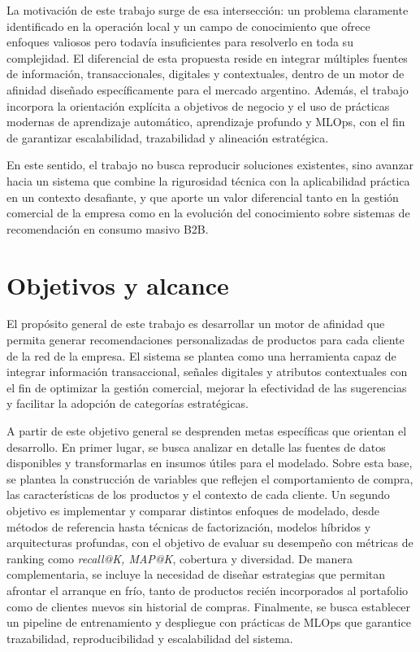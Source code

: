 La motivación de este trabajo surge de esa intersección: un problema claramente identificado en la operación local y un campo de conocimiento que ofrece enfoques valiosos pero todavía insuficientes para resolverlo en toda su complejidad. El diferencial de esta propuesta reside en integrar múltiples fuentes de información, transaccionales, digitales y contextuales, dentro de un motor de afinidad diseñado específicamente para el mercado argentino. Además, el trabajo incorpora la orientación explícita a objetivos de negocio y el uso de prácticas modernas de aprendizaje automático, aprendizaje profundo y MLOps, con el fin de garantizar escalabilidad, trazabilidad y alineación estratégica.

En este sentido, el trabajo no busca reproducir soluciones existentes, sino avanzar hacia un sistema que combine la rigurosidad técnica con la aplicabilidad práctica en un contexto desafiante, y que aporte un valor diferencial tanto en la gestión comercial de la empresa como en la evolución del conocimiento sobre sistemas de recomendación en consumo masivo B2B.



\section{Objetivos y alcance}

El propósito general de este trabajo es desarrollar un motor de afinidad que permita generar recomendaciones personalizadas de productos para cada cliente de la red de la empresa. El sistema se plantea como una herramienta capaz de integrar información transaccional, señales digitales y atributos contextuales con el fin de optimizar la gestión comercial, mejorar la efectividad de las sugerencias y facilitar la adopción de categorías estratégicas.

A partir de este objetivo general se desprenden metas específicas que orientan el desarrollo. En primer lugar, se busca analizar en detalle las fuentes de datos disponibles y transformarlas en insumos útiles para el modelado. Sobre esta base, se plantea la construcción de variables que reflejen el comportamiento de compra, las características de los productos y el contexto de cada cliente. Un segundo objetivo es implementar y comparar distintos enfoques de modelado, desde métodos de referencia hasta técnicas de factorización, modelos híbridos y arquitecturas profundas, con el objetivo de evaluar su desempeño con métricas de ranking como \textit{recall@K, MAP@K}, cobertura y diversidad. De manera complementaria, se incluye la necesidad de diseñar estrategias que permitan afrontar el arranque en frío, tanto de productos recién incorporados al portafolio como de clientes nuevos sin historial de compras. Finalmente, se busca establecer un pipeline de entrenamiento y despliegue con prácticas de MLOps que garantice trazabilidad, reproducibilidad y escalabilidad del sistema.

